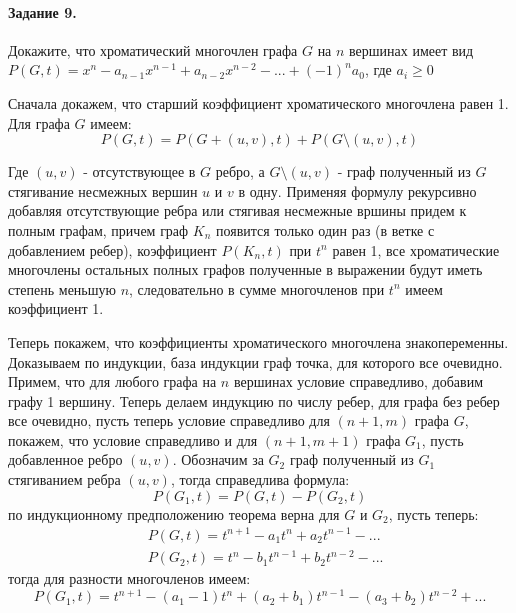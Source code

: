 \documentclass[a4paper,12pt]{article}
\begin{document}
\paragraph{Задание 9.} Докажите, что хроматический многочлен графа $G$ на $n$ вершинах имеет вид $P\left(G,t\right) = x^n - a_{n-1} x^{n-1} + a_{n-2} x^{n-2} - ... + \left(-1\right)^n a_0$, где $a_i \ge 0$

\begin{Solution}
Сначала докажем, что старший коэффициент хроматического многочлена равен 1. Для графа $G$ имеем:
\[
	P\left(G,t\right) = P\left(G+\left(u,v\right),t\right) + P\left(G \setminus \left(u,v\right), t\right)
\]

Где $\left(u,v\right)$ - отсутствующее в $G$ ребро, а $G \setminus \left(u,v\right)$ - граф полученный из $G$ стягивание несмежных вершин $u$ и $v$ в одну. Применяя формулу рекурсивно добавляя отсутствующие ребра или стягивая несмежные вршины придем к полным графам, причем граф $K_n$ появится только один раз (в ветке с добавлением ребер), коэффициент $P\left(K_n, t\right)$ при $t^n$ равен 1, все хроматические многочлены остальных полных графов полученные в выражении будут иметь степень меньшую $n$, следовательно в сумме многочленов при $t^n$ имеем коэффициент 1.

Теперь покажем, что коэффициенты хроматического многочлена знакопеременны. Доказываем по индукции, база индукции граф точка, для которого все очевидно. Примем, что для любого графа на $n$ вершинах условие справедливо, добавим графу 1 вершину. Теперь делаем индукцию по числу ребер, для графа без ребер все очевидно, пусть теперь условие справедливо для $\left(n+1,m\right)$ графа $G$, покажем, что условие справедливо и для $\left(n+1,m+1\right)$ графа $G_1$, пусть добавленное ребро $\left(u,v\right)$. Обозначим за $G_2$ граф полученный из $G_1$ стягиванием ребра $\left(u,v\right)$, тогда справедлива формула:
\[
	P\left(G_1, t\right) = P\left(G,t\right) - P\left(G_2, t\right)
\]
по индукционному предположению теорема верна для $G$ и $G_2$, пусть теперь:
\[
	\begin{split}
		& P\left(G,t\right) = t^{n+1} - a_1 t^{n} + a_2 t^{n-1} - ... \\
		& P\left(G_2,t\right) = t^n - b_1 t^{n-1} + b_2 t^{n-2} - ...
	\end{split}
\]
тогда для разности многочленов имеем:
\[
	P\left(G_1, t\right) = t^{n+1} - \left(a_1 - 1\right) t^n + \left(a_2 + b_1\right) t^{n-1} - \left(a_3 + b_2\right) t^{n-2} + ...
\]
\end{Solution}
\end{document}
